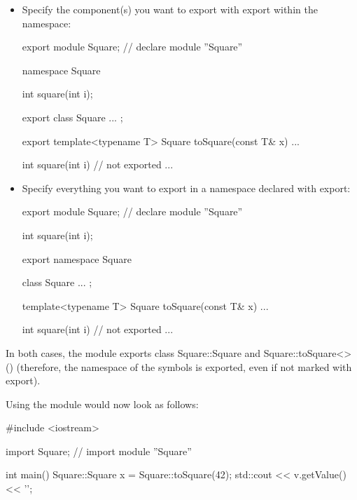 \begin{itemize}
\item 
Specify the component(s) you want to export with export within the namespace:
 
\begin{cpp}
export module Square; // declare module ”Square”

namespace Square {
	int square(int i);
	
	export class Square {
		...
	};
	
	export template<typename T>
	Square toSquare(const T& x) {
		...
	}
	
	int square(int i) { // not exported
		...
	}
}
\end{cpp}

\item 
Specify everything you want to export in a namespace declared with export:

\begin{cpp}
export module Square; // declare module ”Square”

int square(int i);

export namespace Square {
	class Square {
		...
	};
	
	template<typename T>
	Square toSquare(const T& x) {
		...
	}
}

int square(int i) { // not exported
	...
}
\end{cpp}

\end{itemize}

In both cases, the module exports class Square::Square and Square::toSquare<>() (therefore, the namespace of the symbols is exported, even if not marked with export).

Using the module would now look as follows:

\begin{cpp}
#include <iostream>

import Square; // import module ”Square”

int main()
{
	Square::Square x = Square::toSquare(42);
	std::cout << v.getValue() << '\n';
}
\end{cpp}

